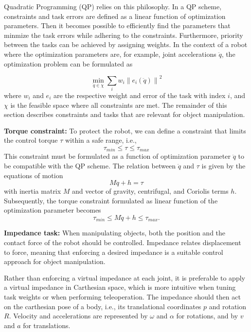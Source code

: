 \documentclass[a4paper, 10pt, conference]{ieeeconf}
\begin{document}
     Quadratic Programming (QP) relies on this philosophy. In a QP scheme, constraints and task errors are defined as a linear function of optimization parameters. Then it becomes possible to efficiently find the parameters that minmize the task errors while adhering to the constraints. Furthermore, priority between the tasks can be achieved by assigning weights. 
     In the context of a robot where the optimization parameters are, for example, joint accelerations $\ddot{q}$, the optimization problem can be formulated as

     \begin{equation}
     \min_{\ddot{q}\in\chi}\sum_i w_i \left \| e_i(\ddot{q}) \right \|^2
     \end{equation}
     where $w_i$ and $e_i$ are the respective weight and error of the task with index $i$, and $\chi$ is the feasible space where all constraints are met. The remainder of this section describes constraints and tasks that are relevant for object manipulation.

     \textbf{Torque constraint:} To protect the robot, we can define a constraint that limits the control torque $\tau$ within a safe range, i.e.,
     \begin{equation}
       \tau_{min} \leq\tau \leq  \tau_{max} 
     \end{equation}
     This constraint must be formulated as a function of optimization parameter $\ddot q$ to be compatible with the QP scheme. The relation between $\ddot{q}$ and $\tau$ is given by the equations of motion
     \begin{equation}
        M\ddot{q}+h=\tau
     \end{equation}    
     with inertia matrix $M$ and vector of gravity, centrifugal, and Coriolis terms $h$. Subsequently, the torque constraint formulated as linear function of the optimization parameter becomes
    \begin{equation}
     \tau_{min} \leq M\ddot{q}+h \leq  \tau_{max}.       
     \end{equation} 

     \textbf{Impedance task:} When manipulating objects, both the position and the contact force of the robot should be controlled. Impedance relates displacement to force, meaning that enforcing a desired impedance is a suitable control approach for object manipulation.

     Rather than enforcing a virtual impedance at each joint, it is preferable to apply a virtual impedance in Carthesian space, which is more intuitive when tuning task weights or when performing teleoperation. The impedance should then act on the carthesian pose of a body, i.e., its translational coordinates $p$ and rotation $R$. Velocity and accelerations are represented by $\omega$ and $\alpha$ for rotations, and by $v$ and $a$ for translations.
\end{document}
